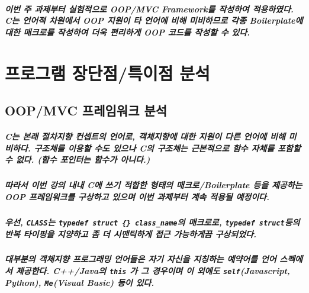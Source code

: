 \documentclass[UTF8]{report}
\begin{document}
            \paragraph{%
                \normalfont 이번 주 과제부터 실험적으로 OOP/MVC Framework를 작성하여 적용하였다. C는 언어적 차원에서 OOP 지원이 타 언어에 비해 미비하므로 각종 Boilerplate에 대한 매크로를 작성하여 더욱 편리하게 OOP 코드를 작성할 수 있다.
            }
            
    \chapter{프로그램 장단점/특이점 분석}
        \section{OOP/MVC 프레임워크 분석}
            \paragraph{%
                \normalfont C는 본래 절차지향 컨셉트의 언어로, 객체지향에 대한 지원이 다른 언어에 비해 미비하다. 구조체를 이용할 수도 있으나 C의 구조체는 근본적으로 함수 자체를 포함할 수 없다. (함수 포인터는 함수가 아니다.)
            }

            \paragraph{%
                \normalfont 따라서 이번 강의 내내 C에 쓰기 적합한 형태의 매크로/Boilerplate 등을 제공하는 OOP 프레임워크를 구상하고 있으며 이번 과제부터 계속 적용될 예정이다.
            }

            \paragraph{%
                \normalfont 우선, \texttt{CLASS}는 \texttt{typedef struct \{\} class\_name}의 매크로로, \texttt{typedef struct}등의 반복 타이핑을 지양하고 좀 더 시맨틱하게 접근 가능하게끔 구상되었다.
            }

            \paragraph{%
                \normalfont 대부분의 객체지향 프로그래밍 언어들은 자기 자신을 지칭하는 예약어를 언어 스펙에서 제공한다. C++/Java의 \texttt{this} 가 그 경우이며 이 외에도 \texttt{self}(Javascript, Python), \texttt{Me}(Visual Basic) 등이 있다.
            }
        
\end{document}

